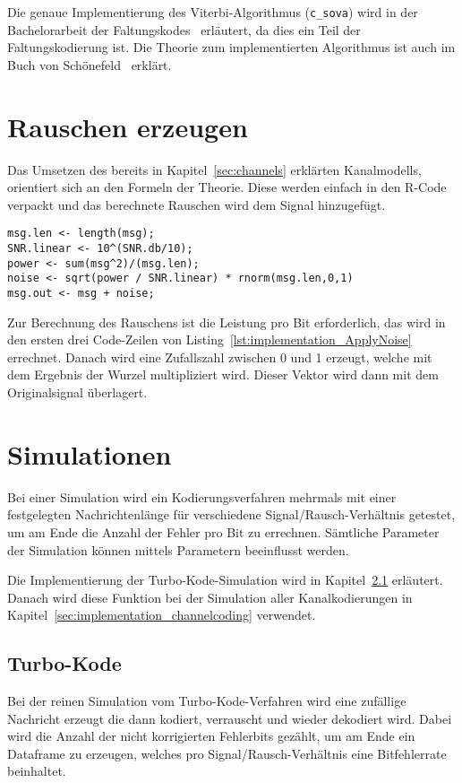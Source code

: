 Die genaue Implementierung des Viterbi-Algorithmus (\texttt{c\_sova}) wird in der Bachelorarbeit der Faltungskodes~\cite[S.~27~ff.]{nocker} erläutert, da dies ein Teil der Faltungskodierung ist. Die Theorie zum implementierten Algorithmus ist auch im Buch von Schönefeld~\cite[222-233]{schoenfeld2012informations} erklärt.

\FloatBarrier
\section{Rauschen erzeugen}
\label{sec:implementation_applyNoise}
Das Umsetzen des bereits in Kapitel~\ref{sec:channels} erklärten Kanalmodells, orientiert sich an den Formeln der Theorie. Diese werden einfach in den R-Code verpackt und das berechnete Rauschen wird dem Signal hinzugefügt.  

\begin{lstlisting}[caption=Implementierung von \texttt{ApplyNoise}, label={lst:implementation_ApplyNoise}, float=!th]
msg.len <- length(msg);
SNR.linear <- 10^(SNR.db/10);
power <- sum(msg^2)/(msg.len); 
noise <- sqrt(power / SNR.linear) * rnorm(msg.len,0,1)
msg.out <- msg + noise;
\end{lstlisting}

Zur Berechnung des Rauschens ist die Leistung pro Bit erforderlich, das wird in den ersten drei Code-Zeilen von Listing~\ref{lst:implementation_ApplyNoise} errechnet. Danach wird eine Zufallszahl zwischen 0 und 1 erzeugt, welche mit dem Ergebnis der Wurzel multipliziert wird. Dieser Vektor wird dann mit dem Originalsignal überlagert.

\FloatBarrier
\section{Simulationen}
\label{sec:implementation_simulation}
Bei einer Simulation wird ein Kodierungsverfahren mehrmals mit einer festgelegten Nachrichtenlänge für verschiedene Signal/Rausch-Verhältnis getestet, um am Ende die Anzahl der Fehler pro Bit zu errechnen. Sämtliche Parameter der Simulation können mittels Parametern beeinflusst werden.

Die Implementierung der Turbo-Kode-Simulation wird in Kapitel~\ref{sec:implementation_turbo} erläutert. Danach wird diese Funktion bei der Simulation aller Kanalkodierungen in Kapitel~\ref{sec:implementation_channelcoding} verwendet.

\subsection{Turbo-Kode}
\label{sec:implementation_turbo}
Bei der reinen Simulation vom Turbo-Kode-Verfahren wird eine zufällige Nachricht erzeugt die dann kodiert, verrauscht und wieder dekodiert wird. Dabei wird die Anzahl der nicht korrigierten Fehlerbits gezählt, um am Ende ein Dataframe zu erzeugen, welches pro Signal/Rausch-Verhältnis eine Bitfehlerrate beinhaltet.

